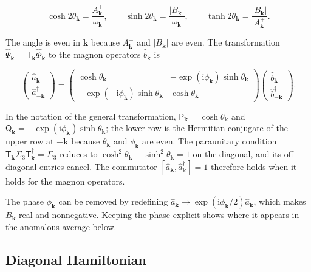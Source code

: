 \[
\cosh2\theta_{\mathbf k}=\frac{A_{\mathbf k}^{+}}{\omega_{\mathbf k}},
\qquad
\sinh2\theta_{\mathbf k}=\frac{|B_{\mathbf k}|}{\omega_{\mathbf k}},
\qquad
\tanh2\theta_{\mathbf k}=\frac{|B_{\mathbf k}|}{A_{\mathbf k}^{+}}.
\]

The angle is even in \(\mathbf k\) because \(A_{\mathbf k}^{+}\) and \(|B_{\mathbf k}|\) are even. The transformation \(\hat\Psi_{\mathbf k}=\mathsf T_{\mathbf k}\hat\Phi_{\mathbf k}\) to the magnon operators \(\hat b_{\mathbf k}\) is

\begin{equation}\label{eq-lswt-example-bogoliubov}
\begin{pmatrix}\hat a_{\mathbf k}\\ \hat a_{-\mathbf k}^\dagger\end{pmatrix}
=\begin{pmatrix}
\cosh\theta_{\mathbf k} & -\exp(\mathrm i\phi_{\mathbf k})\sinh\theta_{\mathbf k}\\
-\exp(-\mathrm i\phi_{\mathbf k})\sinh\theta_{\mathbf k} & \cosh\theta_{\mathbf k}
\end{pmatrix}
\begin{pmatrix}\hat b_{\mathbf k}\\ \hat b_{-\mathbf k}^\dagger\end{pmatrix}.
\end{equation}

In the notation of the general transformation, \(\mathsf P_{\mathbf k}=\cosh\theta_{\mathbf k}\) and \(\mathsf Q_{\mathbf k}=-\exp(\mathrm i\phi_{\mathbf k})\sinh\theta_{\mathbf k}\); the lower row is the Hermitian conjugate of the upper row at \(-\mathbf k\) because \(\theta_{\mathbf k}\) and \(\phi_{\mathbf k}\) are even. The paraunitary condition \(\mathsf T_{\mathbf k}\Sigma_3\mathsf T_{\mathbf k}^\dagger=\Sigma_3\) reduces to \(\cosh^2\theta_{\mathbf k}-\sinh^2\theta_{\mathbf k}=1\) on the diagonal, and its off-diagonal entries cancel. The commutator \([\hat a_{\mathbf k},\hat a_{\mathbf k}^\dagger]=1\) therefore holds when it holds for the magnon operators.

The phase \(\phi_{\mathbf k}\) can be removed by redefining \(\hat a_{\mathbf k}\to\exp(\mathrm i\phi_{\mathbf k}/2)\hat a_{\mathbf k}\), which makes \(B_{\mathbf k}\) real and nonnegative. Keeping the phase explicit shows where it appears in the anomalous average below.

\subsection{Diagonal Hamiltonian}

